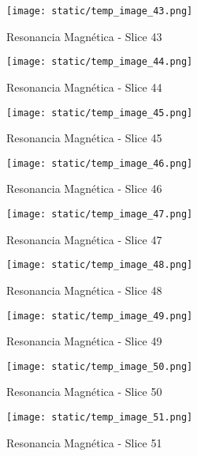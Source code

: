 \documentclass[12pt,a4paper]{article}%
\begin{document}
%


\begin{figure}[H]%
\centering%
\texttt{[image: static/temp\_image\_43.png]}%
\caption{Resonancia Magnética {-} Slice 43}%
\end{figure}

%


\begin{figure}[H]%
\centering%
\texttt{[image: static/temp\_image\_44.png]}%
\caption{Resonancia Magnética {-} Slice 44}%
\end{figure}

%


\begin{figure}[H]%
\centering%
\texttt{[image: static/temp\_image\_45.png]}%
\caption{Resonancia Magnética {-} Slice 45}%
\end{figure}

%


\begin{figure}[H]%
\centering%
\texttt{[image: static/temp\_image\_46.png]}%
\caption{Resonancia Magnética {-} Slice 46}%
\end{figure}

%


\begin{figure}[H]%
\centering%
\texttt{[image: static/temp\_image\_47.png]}%
\caption{Resonancia Magnética {-} Slice 47}%
\end{figure}

%


\begin{figure}[H]%
\centering%
\texttt{[image: static/temp\_image\_48.png]}%
\caption{Resonancia Magnética {-} Slice 48}%
\end{figure}

%


\begin{figure}[H]%
\centering%
\texttt{[image: static/temp\_image\_49.png]}%
\caption{Resonancia Magnética {-} Slice 49}%
\end{figure}

%


\begin{figure}[H]%
\centering%
\texttt{[image: static/temp\_image\_50.png]}%
\caption{Resonancia Magnética {-} Slice 50}%
\end{figure}

%


\begin{figure}[H]%
\centering%
\texttt{[image: static/temp\_image\_51.png]}%
\caption{Resonancia Magnética {-} Slice 51}%
\end{figure}
\end{document}
